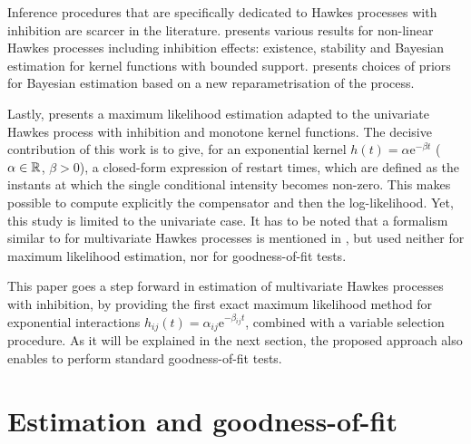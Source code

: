     Inference procedures that are specifically dedicated to Hawkes processes with inhibition are scarcer in the literature. \textcite{Sulem2021} presents various results for non-linear Hawkes processes including inhibition effects: existence, stability and Bayesian estimation for kernel functions with bounded support.
    \textcite{Deutsch2022} presents choices of priors for Bayesian estimation based on a new reparametrisation of the process.

    Lastly, \textcite{bonnet2021} presents a maximum likelihood estimation adapted to the univariate Hawkes process with inhibition and monotone kernel functions.
    The decisive contribution of this work is to give, for an exponential kernel \(h(t) = \alpha \mathrm{e}^{-\beta t}\) (\(\alpha \in {\mathbb R}\), \(\beta>0\)), a closed-form expression of restart times, which are defined as the instants at which the single conditional intensity becomes non-zero.
    This makes possible to compute explicitly the compensator and then the log-likelihood.
    Yet, this study is limited to the univariate case.
    It has to be noted that a formalism similar to \textcite{bonnet2021} for multivariate Hawkes processes is mentioned in \textcite{Deutsch2022},
    but used neither for maximum likelihood estimation, nor for goodness-of-fit tests.

    This paper goes a step forward in estimation of multivariate Hawkes processes with inhibition, by providing the first exact maximum likelihood method for exponential interactions $h_{ij}(t) = \alpha_{ij}\mathrm{e}^{-\beta_{ij}t}$, combined with a variable selection procedure.
    As it will be explained in the next section, the proposed approach also enables to perform standard goodness-of-fit tests.

    \section{Estimation and goodness-of-fit}\label{sec:chap2_exponential}

